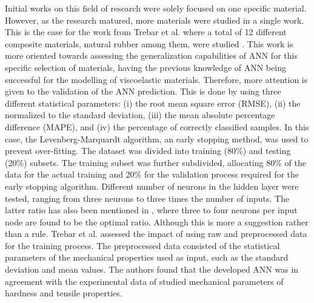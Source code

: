 Initial works on this field of research were solely focused on one specific material. However, as the research matured, more materials were studied in a single work. This is the case for the work from Trebar et al. where a total of 12 different composite materials, natural rubber among them, were studied \cite{trebar2007predicting}. This work is more oriented towards assessing the generalization capabilities of ANN for this specific selection of materials, having the previous knowledge of ANN being successful for the modelling of viscoelastic materials. Therefore, more attention is given to the validation of the ANN prediction. This is done by using three different statistical parameters: (i) the root mean square error (RMSE), (ii) the normalized to the standard deviation, (iii) the mean absolute percentage difference (MAPE), and  (iv) the percentage of correctly classified samples. In this case, the Levenberg-Marquardt algorithm, an early stopping method, was used to prevent over-fitting. The dataset was divided into training (80\%) and testing (20\%) subsets. The training subset was further subdivided, allocating 80\% of the data for the actual training and 20\% for the validation process required for the early stopping algorithm. Different number of neurons in the hidden layer were tested, ranging from three neurons to three times the number of inputs. The latter ratio has also been mentioned in \cite{zhang2003artificial}, where three to four neurons per input node are found to be the optimal ratio. Although this is more a suggestion rather than a rule. Trebar et al. assessed the impact of using raw and preprocessed data for the training process. The preprocessed data consisted of the statistical parameters of the mechanical properties used as input, such as the standard deviation and mean values. The authors found that the developed ANN was in agreement with the experimental data of studied mechanical parameters of hardness and tensile properties.

